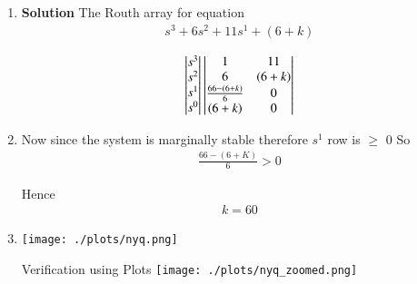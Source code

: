 \begin{enumerate}[label=\thesection.\arabic*.,ref=\thesection.\theenumi]
\item
\textbf{Solution}
The Routh array for equation 
\begin{align}
s^3+6s^2+11s^1+(6+k)
\end{align}

\begin{align}
\begin{vmatrix}s^3\\s^2\\s^1 \\ s^0\end{vmatrix}
\begin{vmatrix}1 & 11 \\ 6 & (6+k) \\  \frac{66-(6+k)}{6} & 0\\ (6+k) & 0\end{vmatrix}
\end{align}

\item
Now since the system is marginally stable therefore $s^1$ row is $\geq$ 0\newline
So 
\begin{align}
    \frac{66-(6+K)}{6}>0
\end{align}

Hence
\begin{align}
k=60
\end{align}
\item
\texttt{[image: ./plots/nyq.png]}


\begin{frame}{Verification using Plots}
\texttt{[image: ./plots/nyq\_zoomed.png]}

\end{frame}

\end{enumerate}





